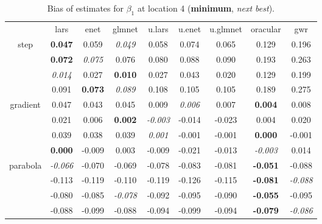 \documentclass[authoryear, review, 11pt]{elsarticle}
\begin{document}
\begin{table}[ht]
\begin{center}
\begin{tabular}{ccccccccc}
  & lars & enet & glmnet & u.lars & u.enet & u.glmnet & oracular & gwr \\ 
  \cline{2-9}
  \multirow{4}{*}{step} & \textbf{0.047} & 0.059 & \emph{0.049} & 0.058 & 0.074 & 0.065 & 0.129 & 0.196 \\ 
  & \textbf{0.072} & \emph{0.075} & 0.076 & 0.080 & 0.088 & 0.090 & 0.193 & 0.263 \\ 
  & \emph{0.014} & 0.027 & \textbf{0.010} & 0.027 & 0.043 & 0.020 & 0.129 & 0.199 \\ 
  & 0.091 & \textbf{0.073} & \emph{0.089} & 0.108 & 0.105 & 0.105 & 0.189 & 0.275 \\ 
  \cline{2-9}
  \multirow{4}{*}{gradient} & 0.047 & 0.043 & 0.045 & 0.009 & \emph{0.006} & 0.007 & \textbf{0.004} & 0.008 \\ 
  & 0.021 & 0.006 & \textbf{0.002} & \emph{-0.003} & -0.014 & -0.023 & 0.004 & 0.020 \\ 
  & 0.039 & 0.038 & 0.039 & \emph{0.001} & -0.001 & -0.001 & \textbf{0.000} & -0.001 \\ 
  & \textbf{0.000} & -0.009 & 0.003 & -0.009 & -0.021 & -0.013 & \emph{-0.003} & 0.014 \\ 
  \cline{2-9}
  \multirow{4}{*}{parabola} & \emph{-0.066} & -0.070 & -0.069 & -0.078 & -0.083 & -0.081 & \textbf{-0.051} & -0.088 \\ 
  & -0.113 & -0.119 & -0.110 & -0.119 & -0.126 & -0.115 & \textbf{-0.081} & \emph{-0.088} \\ 
  & -0.080 & -0.085 & \emph{-0.078} & -0.092 & -0.095 & -0.090 & \textbf{-0.055} & -0.095 \\ 
  & -0.088 & -0.099 & -0.088 & -0.094 & -0.099 & -0.094 & \textbf{-0.079} & \emph{-0.086} \\ 
  \end{tabular}
\caption{Bias of estimates for $\beta_1$ at location 4 (\textbf{minimum}, \emph{next best}).\label{table:loc4-X1-BiasX}}
\end{center}
\end{table}
\end{document}
